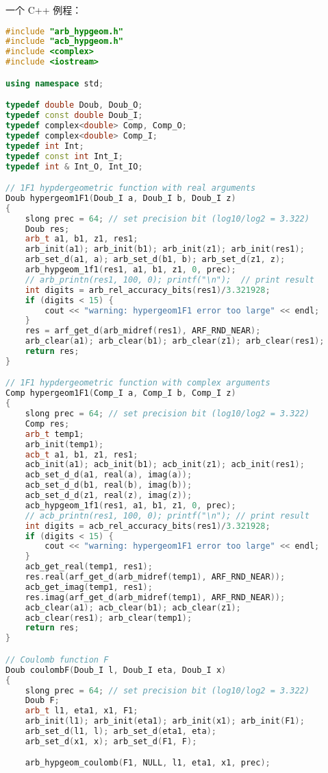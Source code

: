 一个 C++ 例程：
\begin{lstlisting}[language=cpp, caption=test.cpp]
#include "arb_hypgeom.h"
#include "acb_hypgeom.h"
#include <complex>
#include <iostream>

using namespace std;

typedef double Doub, Doub_O;
typedef const double Doub_I;
typedef complex<double> Comp, Comp_O;
typedef complex<double> Comp_I;
typedef int Int;
typedef const int Int_I;
typedef int & Int_O, Int_IO;

// 1F1 hypdergeometric function with real arguments
Doub hypergeom1F1(Doub_I a, Doub_I b, Doub_I z)
{
	slong prec = 64; // set precision bit (log10/log2 = 3.322)
	Doub res;
	arb_t a1, b1, z1, res1;
	arb_init(a1); arb_init(b1); arb_init(z1); arb_init(res1);
	arb_set_d(a1, a); arb_set_d(b1, b);	arb_set_d(z1, z);
	arb_hypgeom_1f1(res1, a1, b1, z1, 0, prec);
	// arb_printn(res1, 100, 0); printf("\n");  // print result
	int digits = arb_rel_accuracy_bits(res1)/3.321928;
	if (digits < 15) {
		cout << "warning: hypergeom1F1 error too large" << endl;
	}
	res = arf_get_d(arb_midref(res1), ARF_RND_NEAR);
	arb_clear(a1); arb_clear(b1); arb_clear(z1); arb_clear(res1);
	return res;
}

// 1F1 hypdergeometric function with complex arguments
Comp hypergeom1F1(Comp_I a, Comp_I b, Comp_I z)
{
	slong prec = 64; // set precision bit (log10/log2 = 3.322)
	Comp res;
	arb_t temp1;
	arb_init(temp1);
	acb_t a1, b1, z1, res1;
	acb_init(a1); acb_init(b1); acb_init(z1); acb_init(res1);
	acb_set_d_d(a1, real(a), imag(a));
	acb_set_d_d(b1, real(b), imag(b));
	acb_set_d_d(z1, real(z), imag(z));
	acb_hypgeom_1f1(res1, a1, b1, z1, 0, prec);
	// acb_printn(res1, 100, 0); printf("\n"); // print result
	int digits = acb_rel_accuracy_bits(res1)/3.321928;
	if (digits < 15) {
		cout << "warning: hypergeom1F1 error too large" << endl;
	}
	acb_get_real(temp1, res1);
	res.real(arf_get_d(arb_midref(temp1), ARF_RND_NEAR));
	acb_get_imag(temp1, res1);
	res.imag(arf_get_d(arb_midref(temp1), ARF_RND_NEAR));
	acb_clear(a1); acb_clear(b1); acb_clear(z1);
    acb_clear(res1); arb_clear(temp1);
	return res;
}

// Coulomb function F
Doub coulombF(Doub_I l, Doub_I eta, Doub_I x)
{
	slong prec = 64; // set precision bit (log10/log2 = 3.322)
	Doub F;
	arb_t l1, eta1, x1, F1;
	arb_init(l1); arb_init(eta1); arb_init(x1); arb_init(F1);
	arb_set_d(l1, l); arb_set_d(eta1, eta);
	arb_set_d(x1, x); arb_set_d(F1, F);

	arb_hypgeom_coulomb(F1, NULL, l1, eta1, x1, prec);
	

\end{lstlisting}
